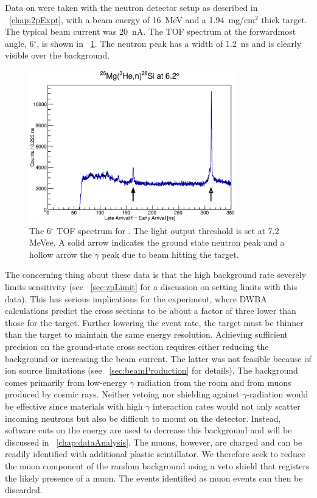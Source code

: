 Data on \MgReaction were taken with the neutron detector setup as described in {\chap}~\ref{chap:2pExpt}, with a beam energy of 16~MeV and a 1.94~mg/cm$^2$ thick  target.  The typical beam current was 20~nA. The TOF spectrum at the forwardmost angle, 6$^{\circ}$, is shown in {\fig}~\ref{fig:MgTOF}.  The neutron peak has a width of 1.2~ns and is clearly visible over the background. 
\begin{figure}[!htbp]
\centering
\includegraphics[width=0.8\textwidth]{figures/26Mg_veryOld.eps}
\caption[Timing spectrum for \MgReaction.]{The 6$^{\circ}$ TOF spectrum for \MgReaction.  The light output threshold is set at 7.2 MeVee.  A solid arrow indicates the ground state neutron peak and a hollow arrow the $\gamma$ peak due to beam hitting the target.}
\label{fig:MgTOF}
\end{figure}

The concerning thing about these data is that the high background rate severely limits sensitivity (see {\sect}~\ref{sec:zpLimit} for a discussion on setting limits with this data).  This has serious implications for the \GeTargets experiment, where DWBA calculations predict the cross sections to be about a factor of three lower than those for the  target.  Further lowering the event rate, the \GeTargets target must be thinner than the  target to maintain the same energy resolution.  Achieving sufficient precision on the ground-state cross section requires either reducing the background or increasing the beam current.  The latter was not feasible because of ion source limitations (see {\sect}~\ref{sec:beamProduction} for details).  The background comes primarily from low-energy $\gamma$ radiation from the room and from muons produced by cosmic rays.  Neither vetoing nor shielding against $\gamma$-radiation would be effective since materials with high $\gamma$ interaction rates would not only scatter incoming neutrons but also be difficult to mount on the detector.  Instead, software cuts on the energy are used to decrease this background and will be discussed in {\chap}~\ref{chap:dataAnalysis}.  The muons, however, are charged and can be readily identified with additional plastic scintillator.  We therefore seek to reduce the muon component of the random background using a veto shield that registers the likely presence of a muon.  The events identified as muon events can then be discarded.  

